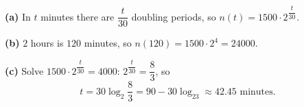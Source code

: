 \textbf{(a)} In $t$ minutes there are $\dfrac{t}{30}$ doubling periods, so $\boxed{n(t)=1500\cdot2^{\dfrac{t}{30}}}$.

\textbf{(b)} $2$ hours is $120$ minutes, so $n(120)=1500\cdot2^4=\boxed{24000}$.

\textbf{(c)} Solve $1500\cdot2^{\dfrac t{30}}=4000$: $2^{\dfrac t{30}}=\dfrac83$, so
\[t=30\log_2\dfrac83=90-30\log_23\approx\boxed{42.45\text{ minutes}}.\]
